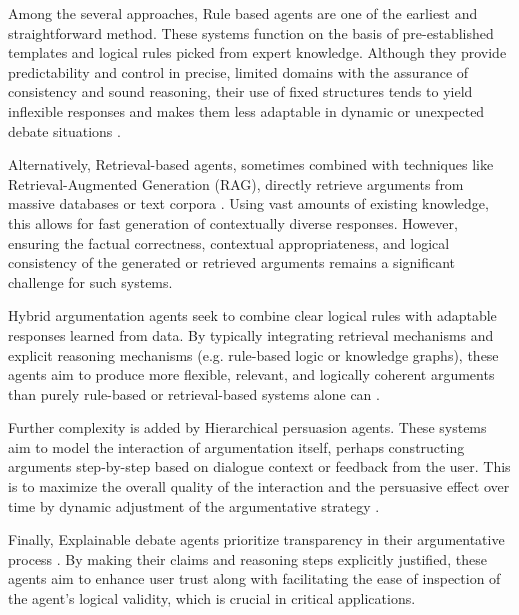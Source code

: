 \documentclass[conference]{IEEEtran}
\begin{document}
Among the several approaches, Rule based agents are one of the earliest and straightforward method. These systems function on the basis of pre-established templates and logical rules picked from expert knowledge. Although they provide predictability and control in precise, limited domains with the assurance of consistency and sound reasoning, their use of fixed structures tends to yield inflexible responses and makes them less adaptable in dynamic or unexpected debate situations \cite{montealto2021rulebased}.

Alternatively, Retrieval-based agents, sometimes combined with techniques like Retrieval-Augmented Generation (RAG), directly retrieve arguments from massive databases or text corpora \cite{kulatska2019arguebot}. Using vast amounts of existing knowledge, this allows for fast generation of contextually diverse responses. However, ensuring the factual correctness, contextual appropriateness, and logical consistency of the generated or retrieved arguments remains a significant challenge for such systems.

Hybrid argumentation agents seek to combine clear logical rules with adaptable responses learned from data. By typically integrating retrieval mechanisms and explicit reasoning mechanisms (e.g. rule-based logic or knowledge graphs), these agents aim to produce more flexible, relevant, and logically coherent arguments than purely rule-based or retrieval-based systems alone can \cite{kulatska2019arguebot}.

Further complexity is added by Hierarchical persuasion agents. These systems aim to model the interaction of argumentation itself, perhaps constructing arguments step-by-step based on dialogue context or feedback from the user. This is to maximize the overall quality of the interaction and the persuasive effect over time by dynamic adjustment of the argumentative strategy \cite{sakai2020hierarchical}.

Finally, Explainable debate agents prioritize transparency in their argumentative process \cite{ali2022supportattack}. By making their claims and reasoning steps explicitly justified, these agents aim to enhance user trust along with facilitating the ease of inspection of the agent's logical validity, which is crucial in critical applications.
\end{document}

